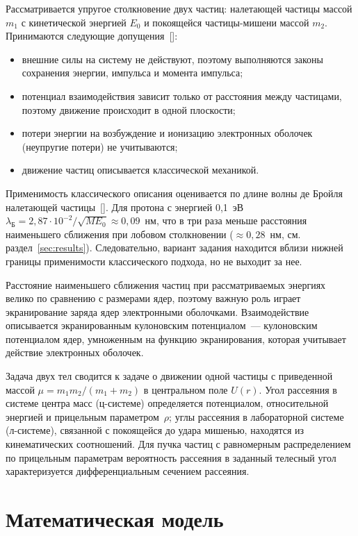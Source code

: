 \documentclass[a4paper,14pt]{extarticle}
\newcommand{\citeitem}[1]{\citesep\ref{#1}\def\citesep{,~}}
\newcommand{\cit}[1]{[\def\citesep{}\forcsvlist{\citeitem}{#1}]}
\begin{document}
Рассматривается упругое столкновение двух частиц: налетающей частицы
массой $m_1$ с кинетической энергией $E_0$ и покоящейся частицы-мишени массой
$m_2$. Принимаются следующие допущения~\cit{ref:manual,ref:landau,ref:eckstein}:
\begin{itemize}
  \item внешние силы на систему не действуют, поэтому выполняются законы
        сохранения энергии, импульса и момента импульса;
  \item потенциал взаимодействия зависит только от расстояния между
        частицами, поэтому движение происходит в одной плоскости;
  \item потери энергии на возбуждение и ионизацию электронных оболочек
        (неупругие потери) не учитываются;
  \item движение частиц описывается классической механикой.
\end{itemize}

Применимость классического описания оценивается по длине волны де Бройля
налетающей частицы~\cit{ref:manual}. Для протона с энергией 0,1~эВ
$\lambda_\text{Б} = 2{,}87\cdot 10^{-2} / \sqrt{M E_0} \approx 0{,}09$~нм,
что в три раза меньше расстояния наименьшего сближения при лобовом
столкновении ($\approx 0{,}28$~нм, см. раздел~\ref{sec:results}).
Следовательно, вариант задания находится вблизи нижней границы применимости
классического подхода, но не выходит за нее.

Расстояние наименьшего сближения частиц при рассматриваемых энергиях
велико по сравнению с размерами ядер, поэтому важную роль играет
экранирование заряда ядер электронными оболочками. Взаимодействие
описывается экранированным кулоновским потенциалом~--- кулоновским
потенциалом ядер, умноженным на функцию экранирования, которая учитывает
действие электронных оболочек.

Задача двух тел сводится к задаче о движении одной частицы с приведенной
массой $\mu = m_1 m_2 / (m_1 + m_2)$ в центральном поле $U(r)$.
Угол рассеяния в системе центра масс (ц-системе) определяется потенциалом,
относительной энергией и прицельным параметром~$\rho$; углы рассеяния
в лабораторной системе (л-системе), связанной с покоящейся до удара мишенью,
находятся из кинематических соотношений. Для пучка частиц с равномерным
распределением по прицельным параметрам вероятность рассеяния в заданный
телесный угол характеризуется дифференциальным сечением рассеяния.

\section{Математическая модель}
\end{document}
